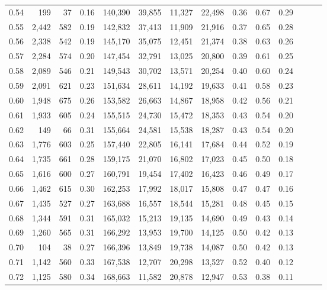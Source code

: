 \begin{tabular}{rrrrrrrrrrrrrr}
0.54 &    199 &     37 &  0.16 &  140,390 &   39,855 &  11,327 &  22,498 &  0.36 &  0.67 &      0.29 \\
0.55 &  2,442 &    582 &  0.19 &  142,832 &   37,413 &  11,909 &  21,916 &  0.37 &  0.65 &      0.28 \\
0.56 &  2,338 &    542 &  0.19 &  145,170 &   35,075 &  12,451 &  21,374 &  0.38 &  0.63 &      0.26 \\
0.57 &  2,284 &    574 &  0.20 &  147,454 &   32,791 &  13,025 &  20,800 &  0.39 &  0.61 &      0.25 \\
0.58 &  2,089 &    546 &  0.21 &  149,543 &   30,702 &  13,571 &  20,254 &  0.40 &  0.60 &      0.24 \\
0.59 &  2,091 &    621 &  0.23 &  151,634 &   28,611 &  14,192 &  19,633 &  0.41 &  0.58 &      0.23 \\
0.60 &  1,948 &    675 &  0.26 &  153,582 &   26,663 &  14,867 &  18,958 &  0.42 &  0.56 &      0.21 \\
0.61 &  1,933 &    605 &  0.24 &  155,515 &   24,730 &  15,472 &  18,353 &  0.43 &  0.54 &      0.20 \\
0.62 &    149 &     66 &  0.31 &  155,664 &   24,581 &  15,538 &  18,287 &  0.43 &  0.54 &      0.20 \\
0.63 &  1,776 &    603 &  0.25 &  157,440 &   22,805 &  16,141 &  17,684 &  0.44 &  0.52 &      0.19 \\
0.64 &  1,735 &    661 &  0.28 &  159,175 &   21,070 &  16,802 &  17,023 &  0.45 &  0.50 &      0.18 \\
0.65 &  1,616 &    600 &  0.27 &  160,791 &   19,454 &  17,402 &  16,423 &  0.46 &  0.49 &      0.17 \\
0.66 &  1,462 &    615 &  0.30 &  162,253 &   17,992 &  18,017 &  15,808 &  0.47 &  0.47 &      0.16 \\
0.67 &  1,435 &    527 &  0.27 &  163,688 &   16,557 &  18,544 &  15,281 &  0.48 &  0.45 &      0.15 \\
0.68 &  1,344 &    591 &  0.31 &  165,032 &   15,213 &  19,135 &  14,690 &  0.49 &  0.43 &      0.14 \\
0.69 &  1,260 &    565 &  0.31 &  166,292 &   13,953 &  19,700 &  14,125 &  0.50 &  0.42 &      0.13 \\
0.70 &    104 &     38 &  0.27 &  166,396 &   13,849 &  19,738 &  14,087 &  0.50 &  0.42 &      0.13 \\
0.71 &  1,142 &    560 &  0.33 &  167,538 &   12,707 &  20,298 &  13,527 &  0.52 &  0.40 &      0.12 \\
0.72 &  1,125 &    580 &  0.34 &  168,663 &   11,582 &  20,878 &  12,947 &  0.53 &  0.38 &      0.11 \\

\end{tabular}
